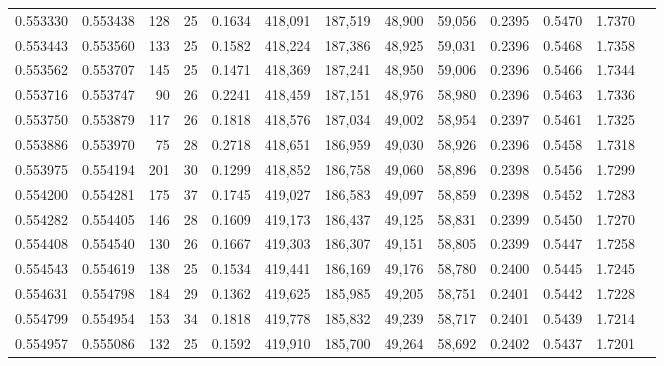 \begin{tabular}{rrrrrrrrrrrrr}
0.553330 & 0.553438 &   128 &  25 &                                     0.1634 & 418,091 & 187,519 &  48,900 &  59,056 & 0.2395 & 0.5470 & 1.7370 \\
0.553443 & 0.553560 &   133 &  25 &                                     0.1582 & 418,224 & 187,386 &  48,925 &  59,031 & 0.2396 & 0.5468 & 1.7358 \\
0.553562 & 0.553707 &   145 &  25 &                                     0.1471 & 418,369 & 187,241 &  48,950 &  59,006 & 0.2396 & 0.5466 & 1.7344 \\
0.553716 & 0.553747 &    90 &  26 &                                     0.2241 & 418,459 & 187,151 &  48,976 &  58,980 & 0.2396 & 0.5463 & 1.7336 \\
0.553750 & 0.553879 &   117 &  26 &                                     0.1818 & 418,576 & 187,034 &  49,002 &  58,954 & 0.2397 & 0.5461 & 1.7325 \\
0.553886 & 0.553970 &    75 &  28 &                                     0.2718 & 418,651 & 186,959 &  49,030 &  58,926 & 0.2396 & 0.5458 & 1.7318 \\
0.553975 & 0.554194 &   201 &  30 &                                     0.1299 & 418,852 & 186,758 &  49,060 &  58,896 & 0.2398 & 0.5456 & 1.7299 \\
0.554200 & 0.554281 &   175 &  37 &                                     0.1745 & 419,027 & 186,583 &  49,097 &  58,859 & 0.2398 & 0.5452 & 1.7283 \\
0.554282 & 0.554405 &   146 &  28 &                                     0.1609 & 419,173 & 186,437 &  49,125 &  58,831 & 0.2399 & 0.5450 & 1.7270 \\
0.554408 & 0.554540 &   130 &  26 &                                     0.1667 & 419,303 & 186,307 &  49,151 &  58,805 & 0.2399 & 0.5447 & 1.7258 \\
0.554543 & 0.554619 &   138 &  25 &                                     0.1534 & 419,441 & 186,169 &  49,176 &  58,780 & 0.2400 & 0.5445 & 1.7245 \\
0.554631 & 0.554798 &   184 &  29 &                                     0.1362 & 419,625 & 185,985 &  49,205 &  58,751 & 0.2401 & 0.5442 & 1.7228 \\
0.554799 & 0.554954 &   153 &  34 &                                     0.1818 & 419,778 & 185,832 &  49,239 &  58,717 & 0.2401 & 0.5439 & 1.7214 \\
0.554957 & 0.555086 &   132 &  25 &                                     0.1592 & 419,910 & 185,700 &  49,264 &  58,692 & 0.2402 & 0.5437 & 1.7201 \\

\end{tabular}
